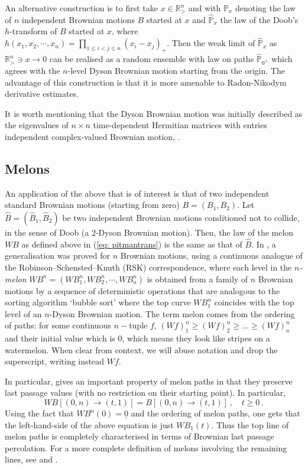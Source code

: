 \documentclass[11pt, reqno]{amsart}
\numberwithin{equation}{section}
\newcommand{\R}{\ensuremath{\mathbb{R}}}
\newcommand{\PP}{\ensuremath{\mathbb{P}}}
\begin{document}
An alternative construction is to first take $x\in \R^n_{>}$ and with $ \PP_x$ denoting the law of $n$ independent Brownian motions $B$ started at $x$ and $\hat{\PP}_x$ the law of the {Doob's} $h$-transform of $B$ started at $x$, where $h(x_1, x_2, \cdots, x_n) = \prod_{1\le i < j\le n}(x_i-x_j)_+$. Then the weak limit of $\hat{\PP}_x$ as $\R^n_> \ni x \to 0$ can be realised as a random ensemble with law on paths $\hat{\PP}_{0^+}$ which agrees with the $n$-level Dyson Brownian motion starting from the origin. The advantage of this construction is that it is more amenable to Radon-Nikodym derivative estimates.

It is worth mentioning that the Dyson Brownian motion was initially described as the eigenvalues of $n \times n$ time-dependent Hermitian matrices with entries independent complex-valued Brownian motion, \cite{dyson1962brownian}. 

\subsection{Melons}\label{subsec: melons}An application of the above that is of interest is that of two independent standard Brownian motions (starting from zero) \(B = (B_1, B_2)\).  Let \(\hat{B}=(\hat{B}_1, \hat{B}_2)\) be two independent Brownian motions conditioned not to collide, in the sense of Doob (a $2$-Dyson Brownian motion). Then, the law of the melon \(WB\) as defined above in (\ref{eq: pitmantrans}) is the same as that of \(\hat{B}\). In \cite{o2002representation}, a generalisation was proved for \(n\) Brownian motions, using a continuous analogue of the Robinson–Schensted–Knuth (RSK) correspondence, where each level in the \emph{$n$-melon} $WB^n = (WB^n_1, WB^n_2, \cdots, WB^n_n)$ is obtained from a family of $n$ Brownian motions by a sequence of deterministic operations that are analogous to the sorting algorithm `bubble sort' where the top curve $WB^n_1$ coincides with the top level of an $n$-Dyson Brownian motion. The term melon comes from the ordering of paths: for some continuous $n-$tuple $f$, $(Wf)^n_1 \ge (Wf)^n_2 \ge \dots \ge (Wf)^n_n$ and their initial value which is $0$, which means they look like stripes on a watermelon. When clear from context, we will abuse notation and drop the superscript, writing instead $Wf$.

In particular, \cite[Proposition 4.1]{DOV} gives an important property of melon paths in that they preserve last passage values (with no restriction on their starting point). In particular, 
\begin{equation*}
WB[(0,n)\to (t,1)] = B[(0,n)\to (t,1)]\,,\quad t\ge 0\,.
\end{equation*}
Using the fact that $WB^n(0) = \underline{0}$ and the ordering of melon paths, one gets that the left-hand-side of the above equation is just $WB_1(t)$. Thus the top line of melon paths is completely characterised in terms of Brownian last passage percolation. For a more complete definition of melons involving the remaining lines, see \cite[sec. 2]{DOV} and \cite{o2002representation}.
\end{document}
